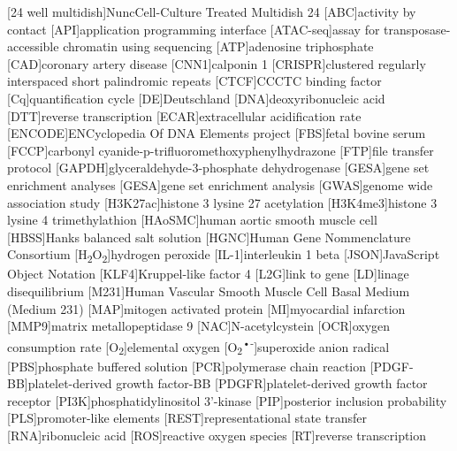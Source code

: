 \begin{acronym}
[24 well multidish]{Nunc\texttrademark Cell-Culture Treated Multidish 24}
[ABC]{activity by contact}
[API]{application programming interface}
[ATAC-seq]{assay for transposase-accessible chromatin using sequencing}
[ATP]{adenosine triphosphate}
[CAD]{coronary artery disease}
[CNN1]{calponin 1}
[CRISPR]{clustered regularly interspaced short palindromic repeats}
[CTCF]{CCCTC binding factor}
[Cq]{quantification cycle}
[DE]{Deutschland}
[DNA]{deoxyribonucleic acid}
[DTT]{reverse transcription}
[ECAR]{extracellular acidification rate}
[ENCODE]{ENCyclopedia Of DNA Elements project}
[FBS]{fetal bovine serum}
[FCCP]{carbonyl cyanide-p-trifluoromethoxyphenylhydrazone}
[FTP]{file transfer protocol}
[GAPDH]{glyceraldehyde-3-phosphate dehydrogenase}
[GESA]{gene set enrichment analyses}
[GESA]{gene set enrichment analysis}
[GWAS]{genome wide association study}
[H3K27ac]{histone 3 lysine 27 acetylation}
[H3K4me3]{histone 3 lysine 4 trimethylathion}
[HAoSMC]{human aortic smooth muscle cell}
[HBSS]{Hanks balanced salt solution}
[HGNC]{Human Gene Nommenclature Consortium}
[H\textsubscript{2}O\textsubscript{2}]{hydrogen peroxide}
[IL-1\beta]{interleukin 1 beta}
[JSON]{JavaScript Object Notation}
[KLF4]{Kruppel-like factor 4}
[L2G]{link to gene}
[LD]{linage disequilibrium}
[M231]{Human Vascular Smooth Muscle Cell Basal Medium (Medium 231)}
[MAP]{mitogen activated protein}
[MI]{myocardial infarction}
[MMP9]{matrix metallopeptidase 9}
[NAC]{N-acetylcystein}
[OCR]{oxygen consumption rate}
[O\textsubscript{2}]{elemental oxygen}
[O\textsubscript{2}\textsuperscript{•-}]{superoxide anion radical}
[PBS]{phosphate buffered solution}
[PCR]{polymerase chain reaction}
[PDGF-BB]{platelet-derived growth factor-BB}
[PDGFR]{platelet-derived growth factor receptor}
[PI3K]{phosphatidylinositol 3'-kinase}
[PIP]{posterior inclusion probability}
[PLS]{promoter-like elements}
[REST]{representational state transfer}
[RNA]{ribonucleic acid}
[ROS]{reactive oxygen species}
[RT]{reverse transcription}

\end{acronym}
